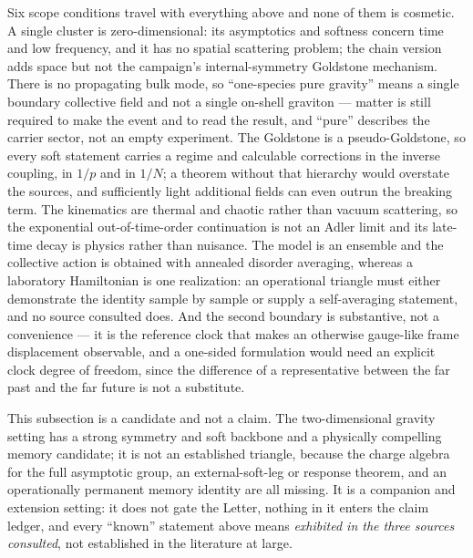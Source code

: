 Six scope conditions travel with everything above and none of them is
cosmetic. A single cluster is zero-dimensional: its asymptotics and softness
concern time and low frequency, and it has no spatial scattering problem; the
chain version adds space but not the campaign's internal-symmetry Goldstone
mechanism. There is no propagating bulk mode, so ``one-species pure gravity''
means a single boundary collective field and not a single on-shell graviton ---
matter is still required to make the event and to read the result, and ``pure''
describes the carrier sector, not an empty experiment. The Goldstone is a
pseudo-Goldstone, so every soft statement carries a regime and calculable
corrections in the inverse coupling, in $1/p$ and in $1/N$; a theorem without
that hierarchy would overstate the sources, and sufficiently light additional
fields can even outrun the breaking term. The kinematics are thermal and
chaotic rather than vacuum scattering, so the exponential out-of-time-order
continuation is not an Adler limit and its late-time decay is physics rather
than nuisance. The model is an ensemble and the collective action is obtained
with annealed disorder averaging, whereas a laboratory Hamiltonian is one
realization: an operational triangle must either demonstrate the identity
sample by sample or supply a self-averaging statement, and no source consulted
does. And the second boundary is substantive, not a convenience --- it is the
reference clock that makes an otherwise gauge-like frame displacement
observable, and a one-sided formulation would need an explicit clock degree of
freedom, since the difference of a representative between the far past and the
far future is not a substitute.

\begin{remark}
\label{rem:op-syk-status}
This subsection is a candidate and not a claim. The two-dimensional
gravity setting has a strong symmetry and soft backbone and a physically
compelling memory candidate; it is not an established triangle, because the
charge algebra for the full asymptotic group, an external-soft-leg or response
theorem, and an operationally permanent memory identity are all missing. It is
a companion and extension setting: it does not gate the Letter, nothing in it
enters the claim ledger, and every ``known'' statement above means
\emph{exhibited in the three sources consulted}, not established in the
literature at large.
\end{remark}


